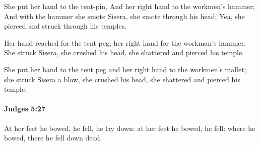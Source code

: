 			\begin{versebox}
					\item[BHS] 
					\item[ASV] She put her hand to the tent-pin, And her right hand to the workmen's hammer; And with the hammer she smote Sisera, she smote through his head; Yea, she pierced and struck through his temples.
					\item[NIV] Her hand reached for the tent peg, her right hand for the workman’s hammer. She struck Sisera, she crushed his head, she shattered and pierced his temple.
					\item[NRSV] She put her hand to the tent peg and her right hand to the workmen’s mallet; she struck Sisera a blow, she crushed his head, she shattered and pierced his temple.
			\end{versebox}

		\paragraph{Judges 5:27} %
			\label{JUDGES-5-27}

			At her feet he bowed, he fell, he lay down: at her feet he bowed, he fell: where he bowed, there he fell down dead.

